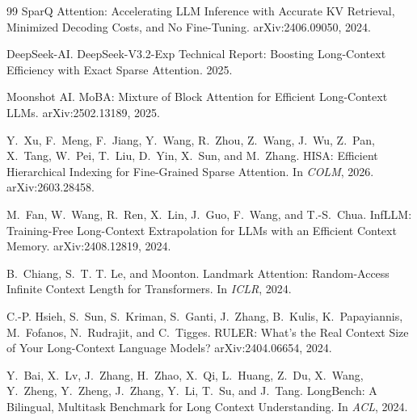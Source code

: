 \documentclass[11pt]{article}
\begin{document}
\begin{thebibliography}{99}
SparQ Attention: Accelerating LLM Inference with Accurate KV Retrieval, Minimized Decoding Costs, and No Fine-Tuning. arXiv:2406.09050, 2024.

DeepSeek-AI. DeepSeek-V3.2-Exp Technical Report: Boosting Long-Context Efficiency with Exact Sparse Attention. 2025.

Moonshot AI. MoBA: Mixture of Block Attention for Efficient Long-Context LLMs. arXiv:2502.13189, 2025.

Y.~Xu, F.~Meng, F.~Jiang, Y.~Wang, R.~Zhou, Z.~Wang, J.~Wu, Z.~Pan, X.~Tang, W.~Pei, T.~Liu, D.~Yin, X.~Sun, and M.~Zhang. HISA: Efficient Hierarchical Indexing for Fine-Grained Sparse Attention. In \emph{COLM}, 2026. arXiv:2603.28458.

M.~Fan, W.~Wang, R.~Ren, X.~Lin, J.~Guo, F.~Wang, and T.-S.~Chua. InfLLM: Training-Free Long-Context Extrapolation for LLMs with an Efficient Context Memory. arXiv:2408.12819, 2024.

B.~Chiang, S.~T. T. Le, and Moonton. Landmark Attention: Random-Access Infinite Context Length for Transformers. In \emph{ICLR}, 2024.

C.-P. Hsieh, S.~Sun, S.~Kriman, S.~Ganti, J.~Zhang, B.~Kulis, K.~Papayiannis, M.~Fofanos, N.~Rudrajit, and C.~Tigges. RULER: What's the Real Context Size of Your Long-Context Language Models? arXiv:2404.06654, 2024.

Y.~Bai, X.~Lv, J.~Zhang, H.~Zhao, X.~Qi, L.~Huang, Z.~Du, X.~Wang, Y.~Zheng, Y.~Zheng, J.~Zhang, Y.~Li, T.~Su, and J.~Tang. LongBench: A Bilingual, Multitask Benchmark for Long Context Understanding. In \emph{ACL}, 2024.

\end{thebibliography}
\end{document}

